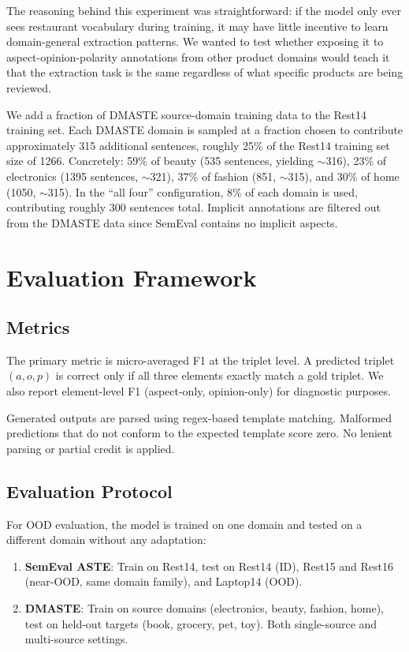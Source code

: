 \documentclass[12pt,a4paper]{report}
\begin{document}
The reasoning behind this experiment was straightforward: if the model only ever sees restaurant 
vocabulary during training, it may have little incentive to learn domain-general extraction patterns. 
We wanted to test whether exposing it to aspect-opinion-polarity annotations from other product domains 
would teach it that the extraction task is the same regardless of what specific products are being reviewed.

We add a fraction of DMASTE source-domain training data to the Rest14 training set. Each DMASTE domain is sampled at a fraction chosen to contribute approximately 315 additional sentences, roughly 25\% of the Rest14 training set size of 1266. Concretely: 59\% of beauty (535 sentences, yielding $\sim$316), 23\% of electronics (1395 sentences, $\sim$321), 37\% of fashion (851, $\sim$315), and 30\% of home (1050, $\sim$315). In the ``all four'' configuration, 8\% of each domain is used, contributing roughly 300 sentences total. Implicit annotations are filtered out from the DMASTE data since SemEval contains no implicit aspects.


\section{Evaluation Framework}\label{sec:evaluation}

\subsection{Metrics}

The primary metric is micro-averaged F1 at the triplet level. A predicted triplet $(a, o, p)$ is correct only if all three elements exactly match a gold triplet. We also report element-level F1 (aspect-only, opinion-only) for diagnostic purposes.

Generated outputs are parsed using regex-based template matching. Malformed predictions that do not conform to the expected template score zero. No lenient parsing or partial credit is applied.

\subsection{Evaluation Protocol}

For OOD evaluation, the model is trained on one domain and tested on a different domain without any adaptation:

\begin{enumerate}
    \item \textbf{SemEval ASTE}: Train on Rest14, test on Rest14 (ID), Rest15 and Rest16 (near-OOD, same domain family), and Laptop14 (OOD).
    \item \textbf{DMASTE}: Train on source domains (electronics, beauty, fashion, home), test on held-out targets (book, grocery, pet, toy). Both single-source and multi-source settings.
\end{enumerate}
\end{document}
